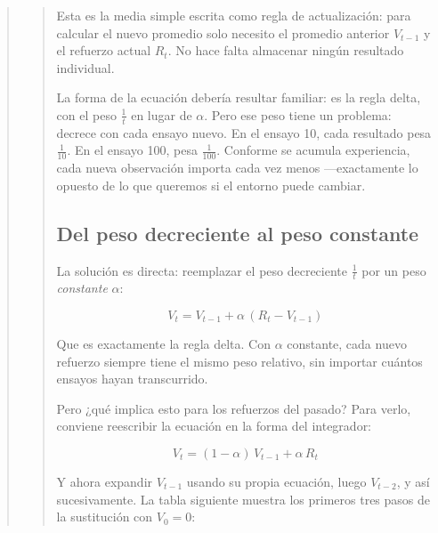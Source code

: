 \documentclass[
  letterpaper,
  DIV=11,
  numbers=noendperiod]{scrreprt}
\begin{document}
\begin{tcolorbox}[enhanced jigsaw, arc=.35mm, bottomrule=.15mm, breakable, colback=white, colframe=quarto-callout-note-color-frame, left=2mm, leftrule=.75mm, opacityback=0, rightrule=.15mm, toprule=.15mm]
\begin{quote}
\begin{quote}
Esta es la media simple escrita como regla de actualización: para
calcular el nuevo promedio solo necesito el promedio anterior
\(V_{t-1}\) y el refuerzo actual \(R_t\). No hace falta almacenar ningún
resultado individual.

La forma de la ecuación debería resultar familiar: es la regla delta,
con el peso \(\frac{1}{t}\) en lugar de \(\alpha\). Pero ese peso tiene
un problema: decrece con cada ensayo nuevo. En el ensayo 10, cada
resultado pesa \(\frac{1}{10}\). En el ensayo 100, pesa
\(\frac{1}{100}\). Conforme se acumula experiencia, cada nueva
observación importa cada vez menos ---exactamente lo opuesto de lo que
queremos si el entorno puede cambiar.

\mbox{}%
\subsection{Del peso decreciente al peso
constante}\label{del-peso-decreciente-al-peso-constante}

La solución es directa: reemplazar el peso decreciente \(\frac{1}{t}\)
por un peso \emph{constante} \(\alpha\):

\[V_t = V_{t-1} + \alpha\,(R_t - V_{t-1})\]

Que es exactamente la regla delta. Con \(\alpha\) constante, cada nuevo
refuerzo siempre tiene el mismo peso relativo, sin importar cuántos
ensayos hayan transcurrido.

Pero ¿qué implica esto para los refuerzos del pasado? Para verlo,
conviene reescribir la ecuación en la forma del integrador:

\[V_t = (1-\alpha)\,V_{t-1} + \alpha\,R_t\]

Y ahora expandir \(V_{t-1}\) usando su propia ecuación, luego
\(V_{t-2}\), y así sucesivamente. La tabla siguiente muestra los
primeros tres pasos de la sustitución con \(V_0 = 0\):


\end{quote}
\end{quote}
\end{tcolorbox}
\end{document}
